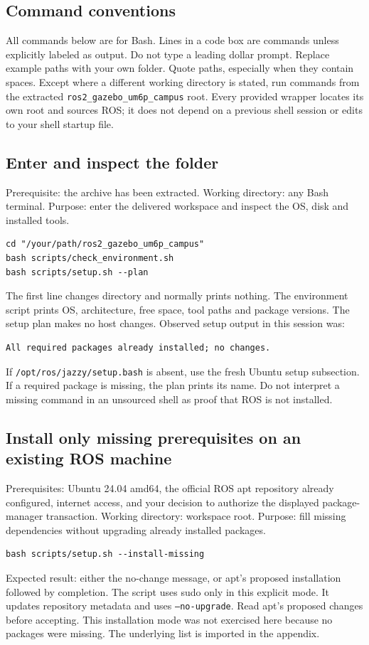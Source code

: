 \subsection{Command conventions}
All commands below are for Bash. Lines in a code box are commands unless explicitly labeled as output. Do not type a leading dollar prompt. Replace example paths with your own folder. Quote paths, especially when they contain spaces. Except where a different working directory is stated, run commands from the extracted \texttt{ros2\_gazebo\_um6p\_campus} root. Every provided wrapper locates its own root and sources ROS; it does not depend on a previous shell session or edits to your shell startup file.

\subsection{Enter and inspect the folder}
Prerequisite: the archive has been extracted. Working directory: any Bash terminal. Purpose: enter the delivered workspace and inspect the OS, disk and installed tools.
\begin{lstlisting}
cd "/your/path/ros2_gazebo_um6p_campus"
bash scripts/check_environment.sh
bash scripts/setup.sh --plan
\end{lstlisting}
The first line changes directory and normally prints nothing. The environment script prints OS, architecture, free space, tool paths and package versions. The setup plan makes no host changes. Observed setup output in this session was:
\begin{lstlisting}
All required packages already installed; no changes.
\end{lstlisting}
If \texttt{/opt/ros/jazzy/setup.bash} is absent, use the fresh Ubuntu setup subsection. If a required package is missing, the plan prints its name. Do not interpret a missing command in an unsourced shell as proof that ROS is not installed.

\subsection{Install only missing prerequisites on an existing ROS machine}
Prerequisites: Ubuntu 24.04 amd64, the official ROS apt repository already configured, internet access, and your decision to authorize the displayed package-manager transaction. Working directory: workspace root. Purpose: fill missing dependencies without upgrading already installed packages.
\begin{lstlisting}
bash scripts/setup.sh --install-missing
\end{lstlisting}
Expected result: either the no-change message, or apt's proposed installation followed by completion. The script uses sudo only in this explicit mode. It updates repository metadata and uses \texttt{--no-upgrade}. Read apt's proposed changes before accepting. This installation mode was not exercised here because no packages were missing. The underlying list is imported in the appendix.

